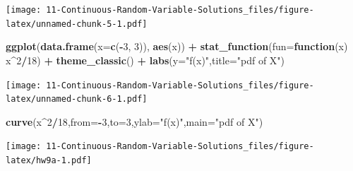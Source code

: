 \documentclass[
]{book}
\newenvironment{Shaded}{\begin{snugshade}}{\end{snugshade}}
\newcommand{\ControlFlowTok}[1]{\textcolor[rgb]{0.13,0.29,0.53}{\textbf{#1}}}
\newcommand{\DataTypeTok}[1]{\textcolor[rgb]{0.13,0.29,0.53}{#1}}
\newcommand{\DecValTok}[1]{\textcolor[rgb]{0.00,0.00,0.81}{#1}}
\newcommand{\FloatTok}[1]{\textcolor[rgb]{0.00,0.00,0.81}{#1}}
\newcommand{\KeywordTok}[1]{\textcolor[rgb]{0.13,0.29,0.53}{\textbf{#1}}}
\newcommand{\NormalTok}[1]{#1}
\newcommand{\OperatorTok}[1]{\textcolor[rgb]{0.81,0.36,0.00}{\textbf{#1}}}
\newcommand{\StringTok}[1]{\textcolor[rgb]{0.31,0.60,0.02}{#1}}
\begin{document}
\begin{Shaded}
\end{Shaded}

\texttt{[image: 11-Continuous-Random-Variable-Solutions\_files/figure-latex/unnamed-chunk-5-1.pdf]}

\begin{Shaded}
\begin{Highlighting}[]
\KeywordTok{ggplot}\NormalTok{(}\KeywordTok{data.frame}\NormalTok{(}\DataTypeTok{x=}\KeywordTok{c}\NormalTok{(}\OperatorTok{-}\DecValTok{3}\NormalTok{, }\DecValTok{3}\NormalTok{)), }\KeywordTok{aes}\NormalTok{(x)) }\OperatorTok{+}\StringTok{ }
\StringTok{ }\KeywordTok{stat_function}\NormalTok{(}\DataTypeTok{fun=}\ControlFlowTok{function}\NormalTok{(x) x}\OperatorTok{^}\DecValTok{2}\OperatorTok{/}\DecValTok{18}\NormalTok{) }\OperatorTok{+}
\StringTok{  }\KeywordTok{theme_classic}\NormalTok{() }\OperatorTok{+}
\StringTok{  }\KeywordTok{labs}\NormalTok{(}\DataTypeTok{y=}\StringTok{"f(x)"}\NormalTok{,}\DataTypeTok{title=}\StringTok{"pdf of X"}\NormalTok{)}
\end{Highlighting}
\end{Shaded}

\texttt{[image: 11-Continuous-Random-Variable-Solutions\_files/figure-latex/unnamed-chunk-6-1.pdf]}

\begin{Shaded}
\begin{Highlighting}[]
\KeywordTok{curve}\NormalTok{(x}\OperatorTok{^}\DecValTok{2}\OperatorTok{/}\DecValTok{18}\NormalTok{,}\DataTypeTok{from=}\OperatorTok{-}\DecValTok{3}\NormalTok{,}\DataTypeTok{to=}\DecValTok{3}\NormalTok{,}\DataTypeTok{ylab=}\StringTok{"f(x)"}\NormalTok{,}\DataTypeTok{main=}\StringTok{"pdf of X"}\NormalTok{)}
\end{Highlighting}
\end{Shaded}

\texttt{[image: 11-Continuous-Random-Variable-Solutions\_files/figure-latex/hw9a-1.pdf]}
\end{document}
